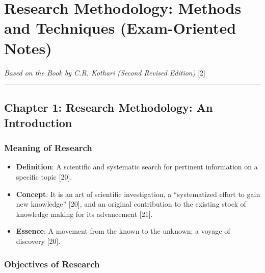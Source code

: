 \documentclass[
]{article}
\author{}
\date{}
\providecommand{\tightlist}{%
  \setlength{\itemsep}{0pt}\setlength{\parskip}{0pt}}
\begin{document}
\section{Research Methodology: Methods and Techniques (Exam-Oriented
Notes)}\label{research-methodology-methods-and-techniques-exam-oriented-notes}

\emph{Based on the Book by C.R. Kothari (Second Revised Edition)}
{[}2{]}

\begin{center}\rule{0.5\linewidth}{0.5pt}\end{center}

\subsection{Chapter 1: Research Methodology: An
Introduction}\label{chapter-1-research-methodology-an-introduction}

\subsubsection{Meaning of Research}\label{meaning-of-research}

\begin{itemize}
\tightlist
\item
  \textbf{Definition}: A scientific and systematic search for pertinent
  information on a specific topic {[}20{]}.
\item
  \textbf{Concept}: It is an art of scientific investigation, a
  ``systematized effort to gain new knowledge'' {[}20{]}, and an
  original contribution to the existing stock of knowledge making for
  its advancement {[}21{]}.
\item
  \textbf{Essence}: A movement from the known to the unknown; a voyage
  of discovery {[}20{]}.
\end{itemize}

\subsubsection{Objectives of Research}\label{objectives-of-research}
\end{document}
